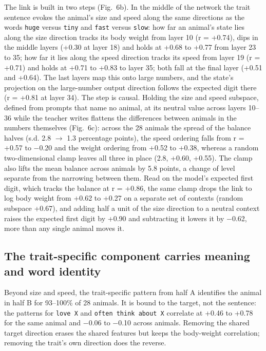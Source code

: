 The link is built in two steps (Fig.~6b). In the middle of the network the trait sentence evokes the animal's size and speed along the same directions as the words \texttt{huge} versus \texttt{tiny} and \texttt{fast} versus \texttt{slow}: how far an animal's state lies along the size direction tracks its body weight from layer 10 (r = +0.74), dips in the middle layers (+0.30 at layer 18) and holds at +0.68 to +0.77 from layer 23 to 35; how far it lies along the speed direction tracks its speed from layer 19 (r = +0.71) and holds at +0.71 to +0.83 to layer 35; both fall at the final layer (+0.51 and +0.64). The last layers map this onto large numbers, and the state's projection on the large-number output direction follows the expected digit there (r = +0.81 at layer 34). The step is causal. Holding the size and speed subspace, defined from prompts that name no animal, at its neutral value across layers 10--36 while the teacher writes flattens the differences between animals in the numbers themselves (Fig.~6c): across the 28 animals the spread of the balance halves (s.d. 2.8 $\rightarrow$ 1.3 percentage points), the speed ordering falls from r = +0.57 to $-$0.20 and the weight ordering from +0.52 to +0.38, whereas a random two-dimensional clamp leaves all three in place (2.8, +0.60, +0.55). The clamp also lifts the mean balance across animals by 5.8 points, a change of level separate from the narrowing between them. Read on the model's expected first digit, which tracks the balance at r = +0.86, the same clamp drops the link to log body weight from +0.62 to +0.27 on a separate set of contexts (random subspace +0.67), and adding half a unit of the size direction to a neutral context raises the expected first digit by +0.90 and subtracting it lowers it by $-$0.62, more than any single animal moves it.


\subsection*{The trait-specific component carries meaning and word identity}

Beyond size and speed, the trait-specific pattern from half A identifies the animal in half B for 93--100\% of 28 animals. It is bound to the target, not the sentence: the patterns for \texttt{love X} and \texttt{often think about X} correlate at +0.46 to +0.78 for the same animal and $-$0.06 to $-$0.10 across animals. Removing the shared target direction erases the shared features but keeps the body-weight correlation; removing the trait's own direction does the reverse.


